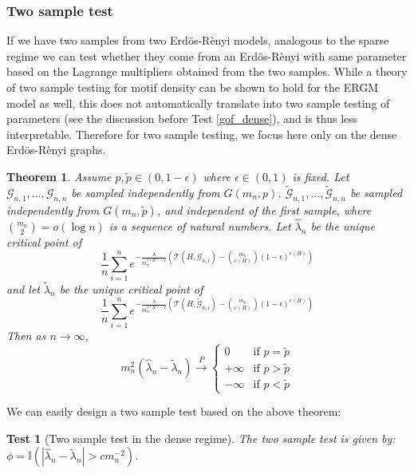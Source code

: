 \documentclass[12pt]{article}
\def\er{ Erd{\"o}s-R{\`e}nyi }
\numberwithin{equation}{section}
\newtheorem{theorem}{Theorem}[section]
\newtheorem{test}{Test}[section]
\begin{document}
\subsubsection{Two sample test}

If we have two samples from two \er models, analogous to the sparse regime we can test whether they come from an \er with same parameter based on the Lagrange multipliers obtained from the two samples. While a theory of two sample testing for motif density can be shown to hold for the ERGM model as well, this does not automatically translate into two sample testing of parameters (see the discussion before Test \ref{gof_dense}), and is thus less interpretable. Therefore for two sample testing, we focus here only on the dense \er graphs.

\begin{theorem}{\label{dense_two_sample}}
Assume \(p,\tilde{p}\in (0,1-\epsilon)\) where \(\epsilon\in(0,1)\) is fixed. Let $\mathcal{G}_{n,1}, \ldots, \mathcal{G}_{n,n}$ be sampled independently from $G\left(m_n, p\right)$, $\tilde{\mathcal{G}}_{n,1}, \ldots, \tilde{\mathcal{G}}_{n,n}$ be sampled independently from $G\left(m_n, \tilde{p}\right)$, and independent of the first sample, where \(\binom{m_n}{2}=o(\log n)\) is a sequence of natural numbers.
Let $\hat{\lambda}_n$ be the unique critical point of
\[
\frac{1}{n}\sum_{i=1}^n e^{-\frac{\lambda}{m_n^{v(H)-2}} (\mathcal{T}(H,\mathcal{G}_{n,i})-{m_n \choose v(H)}(1-\epsilon)^{e(H)})} 
\]
and let $\tilde{\lambda}_n$ be the unique critical point of
\[
\frac{1}{n}\sum_{i=1}^n e^{-\frac{\lambda}{m_n^{v(H)-2}} (\mathcal{T}(H,\tilde{\mathcal{G}}_{n,i})-{m_n\choose v(H)}(1-\epsilon)^{e(H)})} 
\]
Then as $n\rightarrow\infty$,
    \[m_n^2(\hat{\lambda}_n-\tilde{\lambda}_n)\xrightarrow{P} 
    \begin{cases}
        0 & \text{if } p=\tilde{p}\\
        +\infty & \text{if } p>\tilde{p}\\
        -\infty & \text{if } p<\tilde{p}
    \end{cases}
    \]
\end{theorem}


We can easily design a two sample test based on the above theorem:

\begin{test}[Two sample test in the dense regime]{\label{two_sample_dense}}
The two sample test is given by: $\phi=\mathbb{I}(|\hat{\lambda}_n-\tilde{\lambda}_n|>c m^{-2}_n)$.
\end{test}
\end{document}

